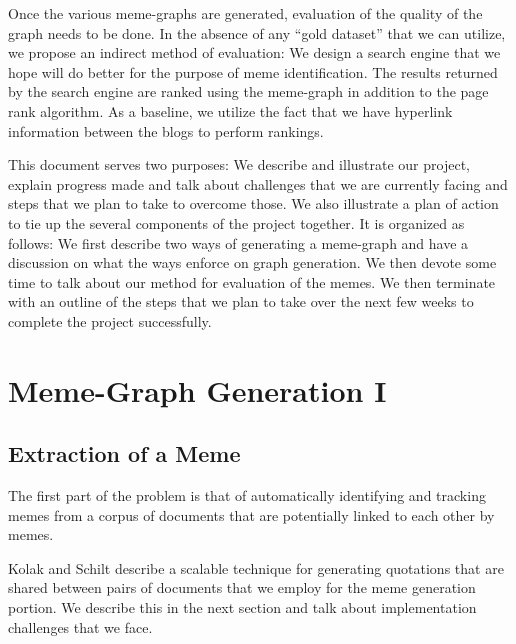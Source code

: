 \documentclass{acm_proc_article-sp}
\begin{document}
Once the various meme-graphs are generated, evaluation of the quality of the graph needs to be done. In the absence of any ``gold dataset'' that we can utilize, we propose an indirect method of evaluation: We design a search engine that we hope will do better for the purpose of meme identification. The results returned by the search engine are ranked using the meme-graph in addition to the page rank algorithm. As a baseline, we utilize the fact that we have hyperlink information between the blogs to perform rankings. 


This document serves two purposes: We describe and illustrate our project, explain progress made and talk about challenges that we are currently facing and steps that we plan to take to overcome those. We also illustrate a plan of action to tie up the several components of the project together. It is organized as follows: We first describe two ways of generating a meme-graph and have a discussion on what the ways enforce on graph generation. We then devote some time to talk about our method for evaluation of the memes. We then terminate with an outline of the steps that we plan to take over the next few weeks to complete the project successfully. 


\section{Meme-Graph Generation I}
\subsection{Extraction of a Meme}
The first part of the problem is that of automatically identifying and tracking memes from a corpus of documents that are potentially linked to each other by memes. 

Kolak and Schilt \cite{kolak2008generating} describe a scalable technique for generating quotations that are shared between pairs of documents that we employ for the meme generation portion. We describe this in the next section and talk about implementation challenges that we face.
\end{document}
